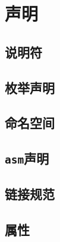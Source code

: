 
\chapter{声明}

\section{说明符}
\section{枚举声明}
\section{命名空间}
\section{\texttt{asm}声明}
\section{链接规范}
\section{属性}

